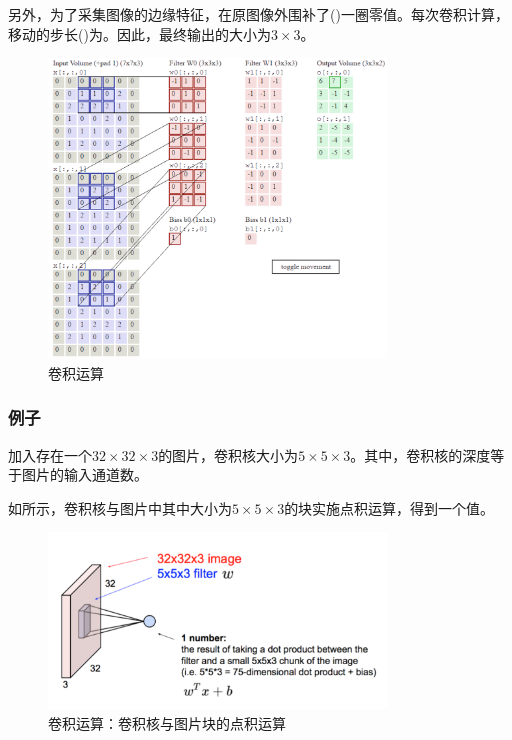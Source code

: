 \begin{content}
另外，为了采集图像的边缘特征，在原图像外围补了()一圈零值。每次卷积计算，移动的步长()为。因此，最终输出的大小为$3 \times 3$。

\begin{figure}[H]
\centering
\includegraphics[width=0.8\textwidth]{figures/mnist-conv2d-gif.png}
\caption{卷积运算}
 \label{fig:mnist-conv2d-gif}
\end{figure}

\subsubsection{例子}

加入存在一个$32 \times 32 \times 3$的图片，卷积核大小为$5 \times 5 \times 3$。其中，卷积核的深度等于图片的输入通道数。

如所示，卷积核与图片中其中大小为$5 \times 5 \times 3$的块实施点积运算，得到一个值。

\begin{figure}[H]
\centering
\includegraphics[width=0.8\textwidth]{figures/convolutional-layer-2.png}
\caption{卷积运算：卷积核与图片块的点积运算}
 \label{fig:mnist-conv-1dot}
\end{figure}


\end{content}
